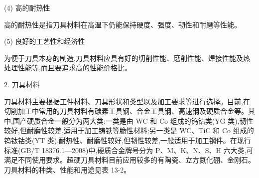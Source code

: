 \documentclass[UTF8]{ctexbook}
\newcommand{\◎}{\ensuremath{\bigcirc}}
\begin{document}
(4) 高的耐热性

高的耐热性是指刀具材料在高温下仍能保持硬度、强度、韧性和耐磨等性能。

(5) 良好的工艺性和经济性

为便于刀具本身的制造,刀具材料应具有好的切削性能、磨削性能、焊接性能及热处理性能等,而且要追求高的性能价格比。

2. 刀具材料

刀具材料主要根据工件材料、刀具形状和类型以及加工要求等进行选择。目前,在切削加工中常用的刀具材料有碳素工具钢、合金工具钢、高速钢及硬质合金等。其中,国产硬质合金一般分为两大类:一类是由 WC 和 Co 组成的钨钴类(YG 类),韧性较好,但耐磨性较差,适用于加工铸铁等脆性材料;另一类是 WC、TiC 和 Co 组成的钨钛钴类(YT 类),耐热性、耐磨性较好,但韧性较差,一般适用于加工钢件。在现行标准(GB/T 18376.1—2008)中,硬质合金牌号分为 P、M、K、N、S、H 六大类,可满足不同使用要求。超硬刀具材料目前应用较多的有陶瓷、立方氮化硼、金刚石。刀具材料的种类、性能和用途见表 13-2。
\end{document}
